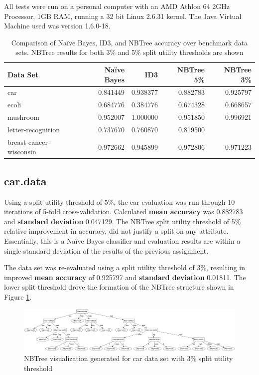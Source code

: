 \documentclass[10pt]{report}
\begin{document}
All tests were run on a personal computer with an AMD Athlon 64 2GHz
Processor, 1GB RAM, running a 32 bit Linux 2.6.31 kernel. The Java
Virtual Machine used was version 1.6.0-18.
\\
\begin{table}[h]
  \centering
  \begin{tabular}{ |l|r|r|r|r|} 
    \hline
    \textbf{Data Set} & \textbf{Na\"{i}ve Bayes} & \textbf{ID3} & \textbf{NBTree 5\%} & \textbf{NBTree 3\%} \\ \hline
    car                      &  0.841449  &  0.938377  & 0.882783  & 0.925797 \\ \hline
    ecoli                    &  0.684776  &  0.384776  & 0.674328  & 0.668657 \\ \hline
    mushroom                 &  0.952007  &  1.000000  & 0.951850  & 0.996921 \\ \hline
    letter-recognition       &  0.737670  &  0.760870  & 0.819500  &          \\ \hline
    breast-cancer-wisconsin  &  0.972662  &  0.945899  & 0.972806  & 0.971223 \\ \hline
  \end{tabular}
  \caption{Comparison of Na\"{i}ve Bayes, ID3, and
    NBTree accuracy over benchmark data sets. NBTree results for both
    3\% and 5\% split utility thresholds are shown}
  \label{tab:comparison}
\end{table}


\subsection*{car.data}
Using a split utility threshold of 5\%, the car evaluation was run
through 10 iterations of 5-fold cross-validation. Calculated
\textbf{mean accuracy} was 0.882783 and 
\textbf{standard deviation} 0.047129. The NBTree split utility
threshold of 5\% relative improvement in accuracy, did not justify a
split on any attribute. Essentially, this is a Na\"{i}ve Bayes
classifier and evaluation results are within a single standard
deviation of the results of the previous assignment.

The data set was re-evaluated using a split utility threshold of 3\%,
resulting in improved \textbf{mean accuracy} of 0.925797 and 
\textbf{standard deviation} 0.01811. The lower split threshold drove
the formation of the NBTree structure shown in Figure \ref{fig:car}.

\begin{figure}
  \begin{center}
	\includegraphics[width=\textwidth,height=!]{car}
  \end{center}
  \caption{NBTree visualization generated for car data set with 3\%
    split utility threshold}
  \label{fig:car}
\end{figure} 
\end{document}
